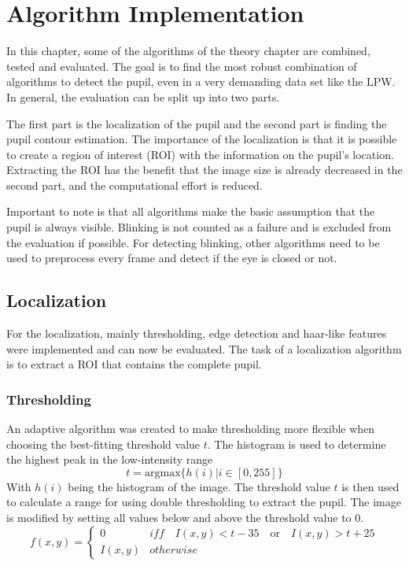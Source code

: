 \chapter{Algorithm Implementation}
In this chapter, some of the algorithms of the theory chapter are combined, tested and evaluated. The goal is to find the most robust combination of algorithms to detect the pupil, even in a very demanding data set like the LPW. In general, the evaluation can be split up into two parts. 

The first part is the localization of the pupil and the second part is finding the pupil contour estimation. The importance of the localization is that it is possible to create a region of interest (ROI) with the information on the pupil's location. Extracting the ROI has the benefit that the image size is already decreased in the second part, and the computational effort is reduced. 

Important to note is that all algorithms make the basic assumption that the pupil is always visible. Blinking is not counted as a failure and is excluded from the evaluation if possible. For detecting blinking, other algorithms need to be used to preprocess every frame and detect if the eye is closed or not. 


\section{Localization}
For the localization, mainly thresholding, edge detection and haar-like features were implemented and can now be evaluated. The task of a localization algorithm is to extract a ROI that contains the complete pupil. 

\subsection{Thresholding}
 An adaptive algorithm was created to make thresholding more flexible when choosing the best-fitting threshold value $t$. The histogram is used to determine the highest peak in the low-intensity range
\begin{equation}
    t = \text{argmax} \{h(i) | i \in [0,255]\}
\end{equation}
With $h(i)$ being the histogram of the image. The threshold value $t$ is then used to calculate a range for using double thresholding to extract the pupil. The image is modified by setting all values below and above the threshold value to 0. 
\begin{equation}
    f(x,y)= \begin{cases}
        0 &iff \quad I(x,y) < t-35 \quad \text{or} \quad I(x,y) > t+25 \\
        I(x,y) &otherwise
    \end{cases}
\end{equation}

